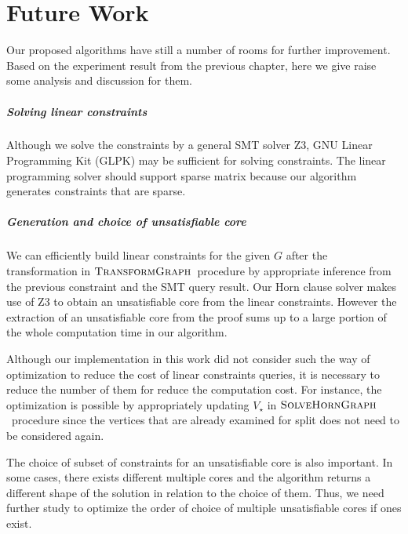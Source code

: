 ﻿\chapter{Future Work}
\label{chap:future}

Our proposed algorithms have still a number of rooms for further
improvement.  Based on the experiment result from the previous
chapter, here we give raise some analysis and discussion for them.


\paragraph{Solving linear constraints}
Although we solve the constraints by a general SMT solver Z3, GNU
Linear Programming Kit (GLPK) may be sufficient for solving
constraints.  The linear programming solver should support sparse
matrix because our algorithm generates constraints that are sparse.


\paragraph{Generation and choice of unsatisfiable core}
We can efficiently build linear constraints for the given $G$ after
the transformation in $\mbox{\sc TransformGraph}$~procedure by appropriate inference
from the previous constraint and the SMT query result.  Our Horn
clause solver makes use of Z3 to obtain an unsatisfiable core from the
linear constraints.  However the extraction of an unsatisfiable core
from the proof sums up to a large portion of the whole computation
time in our algorithm.

Although our implementation in this work did not consider such the way
of optimization to reduce the cost of linear constraints queries, it
is necessary to reduce the number of them for reduce the computation
cost.  For instance, the optimization is possible by appropriately
updating $V_\star$ in $\mbox{\sc SolveHornGraph}$~procedure since the vertices that
are already examined for split does not need to be considered again.

The choice of subset of constraints for an unsatisfiable core is also
important.  In some cases, there exists different multiple cores and
the algorithm returns a different shape of the solution in relation to
the choice of them.  Thus, we need further study to optimize the order
of choice of multiple unsatisfiable cores if ones exist.


